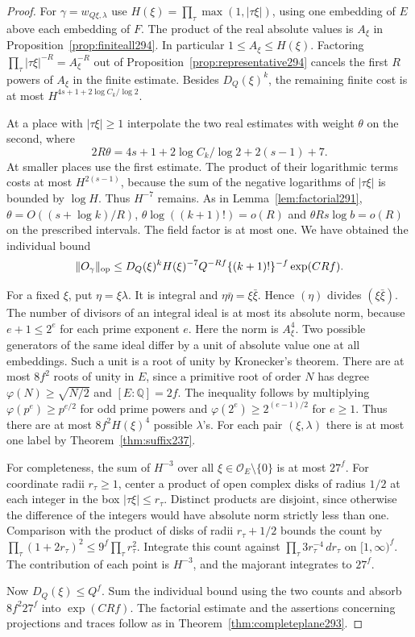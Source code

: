 \documentclass[a4paper,11pt]{article}
\theoremstyle{definition}
\theoremstyle{remark}
\numberwithin{equation}{section}
\begin{document}
\begin{proof}
For \(\gamma=w_{Q\xi,\lambda}\) use
\(H(\xi)=\prod_\tau\max(1,|\tau\xi|)\), using one
embedding of \(E\) above each embedding of \(F\).
The product of the real absolute values is \(A_\xi\)
in Proposition~\ref{prop:finiteall294}. In particular
\(1\le A_\xi\le H(\xi)\). Factoring
\(\prod_\tau|\tau\xi|^{-R}=A_\xi^{-R}\) out of
Proposition~\ref{prop:representative294} cancels the first
\(R\) powers of \(A_\xi\) in the finite estimate. Besides
\(D_Q(\xi)^k\), the remaining finite cost is at most
\(H^{4s+1+2\log C_k/\log 2}\).

At a place with \(|\tau\xi|\ge1\) interpolate the two
real estimates with weight \(\theta\) on the second,
where
\[
    2R\theta=4s+1+2\log C_k/\log2+2(s-1)+7 .
\]
At smaller places use the first estimate. The product
of their logarithmic terms costs at most \(H^{2(s-1)}\),
because the sum of the negative logarithms of
\(|\tau\xi|\) is bounded by \(\log H\). Thus \(H^{-7}\)
remains. As in Lemma~\ref{lem:factorial291},
\(\theta=O((s+\log k)/R)\),
\(\theta\log((k+1)!)=o(R)\) and \(\theta Rs\log b=o(R)\)
on the prescribed intervals. The field factor is at most
one. We have obtained the individual bound
\[
  \|O_\gamma\|_{\rm op}\le D_Q(\xi)^k H(\xi)^{-7}
          Q^{-Rf}\{(k+1)!\}^{-f}\exp(CRf).
\]

For a fixed \(\xi\), put \(\eta=\xi\lambda\).
It is integral and \(\eta\bar\eta=\xi\bar\xi\). Hence
\((\eta)\) divides \((\xi\bar\xi)\). The number of
divisors of an integral ideal is at most its absolute
norm, because \(e+1\le2^e\) for each prime exponent \(e\).
Here the norm is \(A_\xi^4\). Two possible generators
of the same ideal differ by a unit of absolute value one
at all embeddings. Such a unit is a root of unity by
Kronecker's theorem. There are at most \(8f^2\) roots
of unity in \(E\), since a primitive root of order \(N\)
has degree \(\varphi(N)\ge\sqrt{N/2}\) and
\([E:\mathbb Q]=2f\). The inequality follows by
multiplying \(\varphi(p^e)\ge p^{e/2}\) for odd prime
powers and \(\varphi(2^e)\ge2^{(e-1)/2}\) for \(e\ge1\).
Thus there are at most
\(8f^2 H(\xi)^4\) possible \(\lambda\)'s. For each pair
\((\xi,\lambda)\) there is at most one label by
Theorem~\ref{thm:suffix237}.

For completeness, the sum of \(H^{-3}\) over all
\(\xi\in\mathcal O_E\setminus\{0\}\) is at most \(27^f\).
For coordinate radii \(r_\tau\ge1\), center a product
of open complex disks of radius \(1/2\) at each integer
in the box \(|\tau\xi|\le r_\tau\). Distinct products
are disjoint, since otherwise the difference of the
integers would have absolute norm strictly less than one.
Comparison with the product of disks of radii
\(r_\tau+1/2\) bounds the count by
\(\prod_\tau(1+2r_\tau)^2\le9^f\prod_\tau r_\tau^2\).
Integrate this count against
\(\prod_\tau 3r_\tau^{-4}\,dr_\tau\) on \([1,\infty)^f\).
The contribution of each point is \(H^{-3}\), and the
majorant integrates to \(27^f\).

Now \(D_Q(\xi)\le Q^f\). Sum the individual bound using
the two counts and absorb \(8f^2 27^f\) into \(\exp(CRf)\).
The factorial estimate and the assertions concerning
projections and traces follow as in
Theorem~\ref{thm:completeplane293}.
\end{proof}
\end{document}
